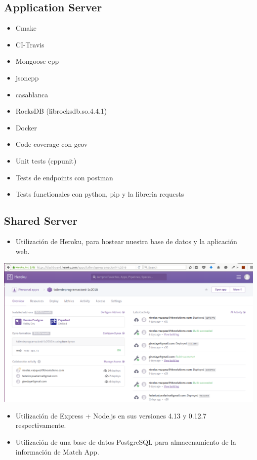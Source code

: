 \documentclass[letterpaper,10pt,english]{sphinxmanual}
\begin{document}
\subsection{Application Server}
\label{manuals:application-server}\begin{itemize}
\item {} 
Cmake

\item {} 
CI-Travis

\item {} 
Mongoose-cpp

\item {} 
jsoncpp

\item {} 
casablanca

\item {} 
RocksDB (librocksdb.so.4.4.1)

\item {} 
Docker

\item {} 
Code coverage con gcov

\item {} 
Unit tests (cppunit)

\item {} 
Tests de endpoints con postman

\item {} 
Tests functionales con python, pip y la libreria requests

\end{itemize}


\subsection{Shared Server}
\label{manuals:shared-server}\begin{itemize}
\item {} 
Utilización de Heroku, para hostear nuestra base de datos y la aplicación web.

\end{itemize}

\includegraphics{heroku.png}
\begin{itemize}
\item {} 
Utilización de Express + Node.js en sus versiones 4.13 y 0.12.7 respectivamente.

\item {} 
Utilización de una base de datos PostgreSQL para almacenamiento de la información de Match App.

\end{itemize}
\end{document}
